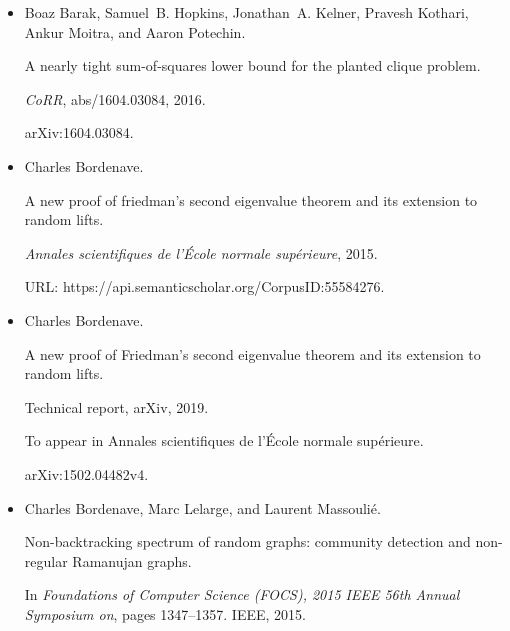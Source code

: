 \documentclass[10pt,a4paper]{article}
\begin{document}
\begin{itemize}
A Nearly Tight Sum-of-Squares Lower Bound for the Planted Clique
Problem.


\emph{SIAM Journal on Computing}, 48(2):687–735, 2019.


doi:10.1137/17M1138236.





\item[] 
[6]

Boaz Barak, Samuel B. Hopkins, Jonathan A. Kelner, Pravesh Kothari, Ankur
Moitra, and Aaron Potechin.


A nearly tight sum-of-squares lower bound for the planted clique
problem.


\emph{CoRR}, abs/1604.03084, 2016.


arXiv:1604.03084.





\item[] 
[7]

Charles Bordenave.


A new proof of friedman’s second eigenvalue theorem and its extension
to random lifts.


\emph{Annales scientifiques de l’École normale supérieure},
2015.


URL: https://api.semanticscholar.org/CorpusID:55584276.





\item[] 
[8]

Charles Bordenave.


A new proof of Friedman’s second eigenvalue theorem and its
extension to random lifts.


Technical report, arXiv, 2019.


To appear in Annales scientifiques de l’École normale
supérieure.


arXiv:1502.04482v4.





\item[] 
[9]

Charles Bordenave, Marc Lelarge, and Laurent Massoulié.


Non-backtracking spectrum of random graphs: community detection and
non-regular Ramanujan graphs.


In \emph{Foundations of Computer Science (FOCS), 2015 IEEE 56th Annual
Symposium on}, pages 1347–1357. IEEE, 2015.



\end{itemize}
\end{document}

